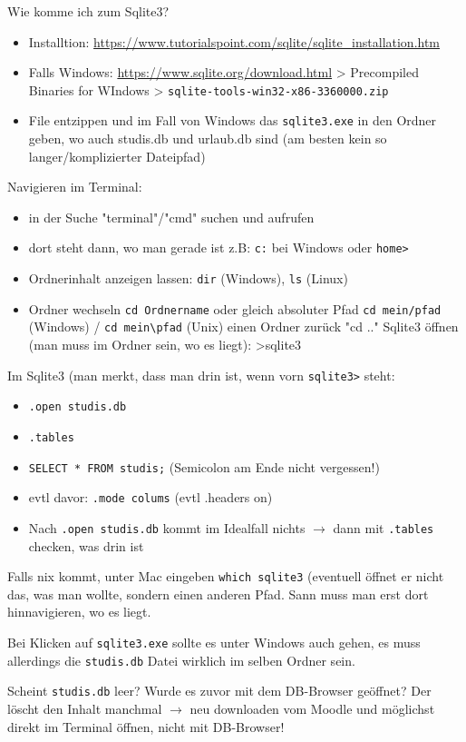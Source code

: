 Wie komme ich zum Sqlite3?
\begin{itemize}
    \item Installtion: \protect\url{https://www.tutorialspoint.com/sqlite/sqlite_installation.htm}
    \item Falls Windows: \protect\url{https://www.sqlite.org/download.html} > Precompiled Binaries for WIndows > \verb|sqlite-tools-win32-x86-3360000.zip|
    \item File entzippen und im Fall von Windows das \texttt{sqlite3.exe} in den Ordner geben, wo auch studis.db und urlaub.db sind (am besten kein so langer/komplizierter Dateipfad)
\end{itemize}


Navigieren im Terminal:
\begin{itemize}
    \item in der Suche "terminal"/"cmd" suchen und aufrufen
    \item dort steht dann, wo man gerade ist z.B: \texttt{c:} bei Windows oder \texttt{home>}
    \item Ordnerinhalt anzeigen lassen: \texttt{dir} (Windows), \texttt{ls} (Linux)
    \item Ordner wechseln \texttt{cd Ordnername} oder gleich absoluter Pfad \verb|cd mein/pfad| (Windows) / \verb|cd mein\pfad| (Unix)
einen Ordner zurück "cd .."
Sqlite3 öffnen (man muss im Ordner sein, wo es liegt): >sqlite3
\end{itemize}

Im Sqlite3 (man merkt, dass man drin ist, wenn vorn \texttt{sqlite3>} steht:
\begin{itemize}
    \item \texttt{.open studis.db}
    \item \texttt{.tables}
    \item \texttt{SELECT * FROM studis;} (Semicolon am Ende nicht vergessen!)
    \item evtl davor: \texttt{.mode colums} (evtl .headers on)
    \item Nach \texttt{.open studis.db} kommt im Idealfall nichts $\to$ dann mit \texttt{.tables} checken, was drin ist
\end{itemize}

Falls nix kommt, unter Mac eingeben \texttt{which sqlite3} (eventuell öffnet er nicht das, was man wollte, sondern einen anderen Pfad. Sann muss man erst dort hinnavigieren, wo es liegt.

Bei Klicken auf \texttt{sqlite3.exe} sollte es unter Windows auch gehen, es muss allerdings die \texttt{studis.db} Datei wirklich im selben Ordner sein.

Scheint \texttt{studis.db} leer? Wurde es zuvor mit dem DB-Browser geöffnet? Der löscht den Inhalt manchmal $\to$ neu downloaden vom Moodle und möglichst direkt im Terminal öffnen, nicht mit DB-Browser!





